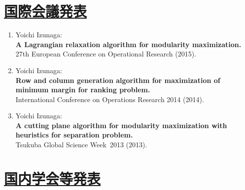 \documentclass[dvipdfmx,9pt,a4paper]{article}
\begin{document}
\section*{\underline{国際会議発表}}

\begin{enumerate}

\item Yoichi Izunaga:\\
{\bf A Lagrangian relaxation algorithm for modularity maximization.}\\
{27th European Conference on Operational Research} (2015).

\item Yoichi Izunaga:\\
{\bf Row and column generation algorithm for maximization of minimum margin for ranking problem.}\\
{International Conference on Operations Research 2014} (2014).


\item Yoichi Izunaga:\\
{\bf A cutting plane algorithm for modularity maximization with heuristics for separation problem.}\\
Tsukuba Global Science Week~2013 (2013).

\end{enumerate}

\section*{\underline{国内学会等発表}}
\end{document}
